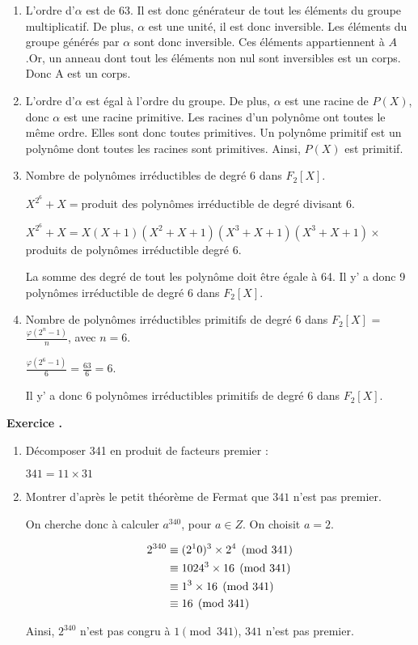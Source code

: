 \documentclass[a4paper,10pt]{article}
\newcounter{exercice}
\newcommand{\exercice}{%
		\refstepcounter{exercice}%
		\bigskip
		\bigskip
		\noindent\textbf{Exercice \theexercice.}~%
	}
\begin{document}
\begin{enumerate}
	\item
	L'ordre d'$\alpha$ est de 63. Il est donc générateur de tout les éléments du groupe multiplicatif. De plus, $\alpha$ est une unité, il est donc inversible. Les éléments du groupe générés par $\alpha$ sont donc inversible. Ces éléments appartiennent à $A$.Or, un anneau dont tout les éléments non nul sont inversibles est un corps. Donc A est un corps.
	\item
	L'ordre d'$\alpha$ est égal à l'ordre du groupe. De plus, $\alpha$ est une racine de $P(X)$, donc $\alpha$ est une racine primitive. Les racines d'un polynôme ont toutes le même ordre. Elles sont donc toutes primitives. Un polynôme primitif est un polynôme dont toutes les racines sont primitives. Ainsi, $P(X)$ est primitif.
	\item
Nombre de polynômes irréductibles de degré 6 dans $F_2[X]$.

$X^{2^6}+X=$produit des polynômes irréductible de degré divisant 6.

$X^{2^6}+X=X(X+1)(X^2+X+1)(X^3+X+1)(X^3+X+1)\times $produits de polynômes irréductible degré 6.

La somme des degré de tout les polynôme doit être égale à 64. Il y' a donc 9 polynômes irréductible de degré 6 dans $F_2[X]$.
	\item
Nombre de polynômes irréductibles primitifs de degré 6 dans $F_2[X]$ = $\frac{\varphi(2^n-1)}{n}$, avec $n=6$.


 $\frac{\varphi(2^6-1)}{6}=\frac{63}{6}=6$.
 
 Il y' a donc 6 polynômes irréductibles primitifs de degré 6 dans $F_2[X]$.

	\end{enumerate}	
	\exercice
	\begin{enumerate}
	\item
	Décomposer 341 en produit de facteurs premier :
	
	$341=11 \times 31$
	\item
	Montrer d'après le petit théorème de Fermat que $341$ n'est pas  premier.
	
	On cherche donc à calculer $a^{340}$, pour $a \in Z$.	
	On choisit $a=2$.
	
	\begin{align}
		2^{340} &\equiv (2^10)^3 \times 2^4 \pmod{341}\notag \\
			  &\equiv 1024^3 \times 16 \pmod{341}\notag \\
			  &\equiv 1^3 \times 16 \pmod{341}\notag \\
			  &\equiv 16 \pmod{341}\notag
	\end{align}
	
	Ainsi, $2^{340}$ n'est pas congru à $1 \pmod{341}$, $341$ n'est pas premier.
	\end{enumerate}
		
	 
\end{document}
